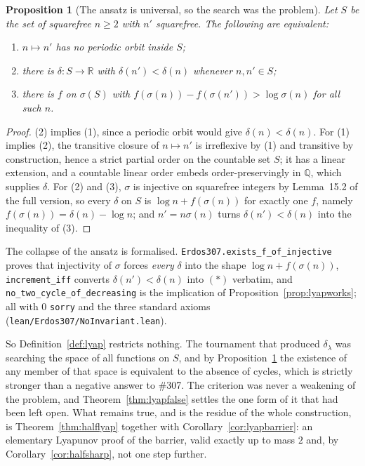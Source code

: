 \documentclass[11pt]{article}
\newtheorem{proposition}[theorem]{Proposition}
\theoremstyle{definition}
\begin{document}
\begin{proposition}[The ansatz is universal, so the search was the problem]\label{prop:lyapuniversal}
Let $S$ be the set of squarefree $n\ge2$ with $n'$ squarefree. The following are equivalent:
\begin{enumerate}[label=\textup{(\arabic*)},leftmargin=2.2em]
\item $n\mapsto n'$ has no periodic orbit inside $S$;
\item there is $\delta:S\to\mathbb{R}$ with $\delta(n')<\delta(n)$ whenever $n,n'\in S$;
\item there is $f$ on $\sigma(S)$ with $f(\sigma(n))-f(\sigma(n'))>\log\sigma(n)$ for all such $n$.
\end{enumerate}
\end{proposition}
\begin{proof}
(2) implies (1), since a periodic orbit would give $\delta(n)<\delta(n)$. For (1) implies (2), the
transitive closure of $n\mapsto n'$ is irreflexive by (1) and transitive by construction, hence a
strict partial order on the countable set $S$; it has a linear extension, and a countable linear
order embeds order-preservingly in $\mathbb{Q}$, which supplies $\delta$. For (2) and (3), $\sigma$
is injective on squarefree integers by Lemma~15.2 of the full version, so every $\delta$ on $S$ is
$\log n+f(\sigma(n))$ for exactly one $f$, namely $f(\sigma(n))=\delta(n)-\log n$; and $n'=n\sigma(n)$
turns $\delta(n')<\delta(n)$ into the inequality of (3).
\end{proof}

The collapse of the ansatz is formalised. \texttt{Erdos307.exists\_f\_of\_injective} proves that
injectivity of $\sigma$ forces \emph{every} $\delta$ into the shape $\log n+f(\sigma(n))$,
\texttt{increment\_iff} converts $\delta(n')<\delta(n)$ into $(\ast)$ verbatim, and
\texttt{no\_two\_cycle\_of\_decreasing} is the implication of
Proposition~\ref{prop:lyapworks}; all with $0$ \texttt{sorry} and the three standard axioms
\textup{(\texttt{lean/Erdos307/NoInvariant.lean})}.

So Definition~\ref{def:lyap} restricts nothing. The tournament that produced $\delta_\lambda$ was
searching the space of all functions on $S$, and by Proposition~\ref{prop:lyapuniversal} the
existence of any member of that space is equivalent to the absence of cycles, which is strictly
stronger than a negative answer to \#307. The criterion was never a weakening of the problem, and
Theorem~\ref{thm:lyapfalse} settles the one form of it that had been left open. What remains true,
and is the residue of the whole construction, is Theorem~\ref{thm:halflyap} together with
Corollary~\ref{cor:lyapbarrier}: an elementary Lyapunov proof of the barrier, valid exactly up to
mass $2$ and, by Corollary~\ref{cor:halfsharp}, not one step further.
\end{document}
